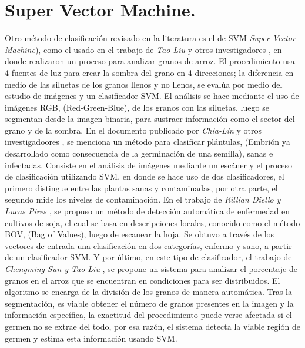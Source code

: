 \section{Super Vector Machine.}
Otro método de clasificación revisado en la literatura es el de SVM \textit{Super Vector Machine}), como el usado en el trabajo de \textit{Tao Liu} y otros investigadores \cite{LIU201679}, en donde realizaron un proceso para analizar granos de arroz. El procedimiento usa 4 fuentes de luz para crear la sombra del grano en 4 direcciones; la diferencia en medio de las siluetas de los granos llenos y no llenos, se evalúa por medio del estudio de imágenes y un clasificador SVM. El análisis se hace mediante el uso de imágenes RGB, (Red-Green-Blue), de los granos con las siluetas, luego se segmentan desde la imagen binaria, para sustraer información como el sector del grano y de la sombra. En el documento publicado por \textit{Chia-Lin}  y otros investigadoores \cite{CHUNG2016404}, se menciona un método para clasificar plántulas, (Embrión ya desarrollado como consecuencia de la germinación de una semilla), sanas e infectadas. Consiste en el análisis de imágenes mediante un escáner y el proceso de clasificación utilizando SVM, en donde se hace uso de dos clasificadores, el primero distingue entre las plantas sanas y contaminadas, por otra parte, el segundo mide los niveles de contaminación. En el trabajo de \textit{Rillian Diello y Lucas Pires} \cite{PIRES201648}, se propuso un método de detección automática de enfermedad en cultivos de soja, el cual se basa en descripciones locales, conocido como el método BOV, (Bag of Values), luego de escanear la hoja. Se obtuvo a través de los vectores de entrada una clasificación en dos categorías, enfermo y sano, a partir de un clasificador SVM. Y por último, en este tipo de clasificador, el trabajo de \textit{Chengming Sun y Tao Liu} \cite{SUN2014426}, se propone un sistema para analizar el porcentaje de granos en el arroz que se encuentran en condiciones para ser distribuidos. El algoritmo se encarga de la división de los granos de manera automática. Tras la segmentación, es viable obtener el número de granos presentes en la imagen y la información específica, la exactitud del procedimiento puede verse afectada si el germen no se extrae del todo, por esa razón, el sistema detecta la viable región de germen y estima esta información usando SVM.\\

